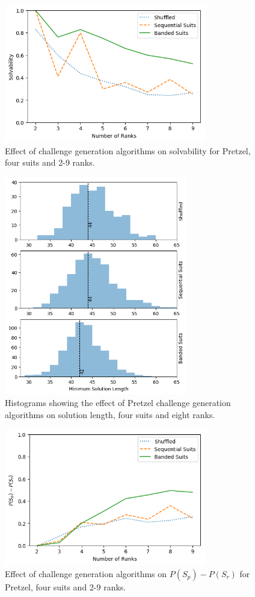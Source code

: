 \documentclass[journal]{IEEEtran}
\begin{document}
\begin{figure}[t]
\includegraphics[width=8.8cm]{figure9.png}
\caption{Effect of challenge generation algorithms on solvability for Pretzel, four suits and 2-9 ranks.}
\label{fig:pretzelfullsolve}
\end{figure}

\begin{figure}[t]
\centering
\includegraphics[width=8cm]{figure10.png}
\caption{Histograms showing the effect of Pretzel challenge generation algorithms on solution length, four suits and eight ranks.}
\label{fig:pretzellength}
\end{figure}

\begin{figure}[t]
\includegraphics[width=8.8cm]{figure11.png}
\caption{Effect of challenge generation algorithms on $P(S_p) - P(S_r)$ for Pretzel, four suits and 2-9 ranks.}
\label{fig:pretzelinterest}
\end{figure}
\end{document}
